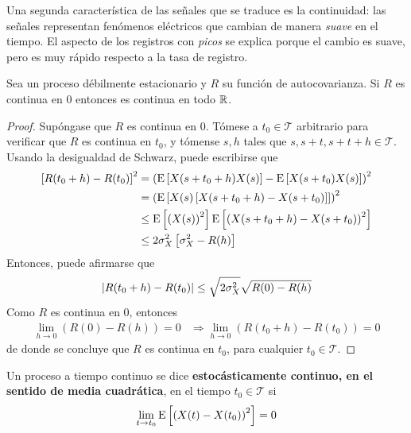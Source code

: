 Una segunda característica de las señales que se traduce es la continuidad: las señales representan fenómenos eléctricos que cambian de manera \textit{suave} en el tiempo.
%
El aspecto de los registros con \textit{picos} se explica porque el cambio es suave, pero es muy rápido respecto a la tasa de registro.

\begin{proposicion}
Sea \xt un proceso débilmente estacionario y $R$ su función de autocovarianza. Si $R$ es continua
en 0 entonces es continua en todo $\mathbb{R}$.
\end{proposicion}

\begin{proof}
Supóngase que $R$ es continua en 0. Tómese a $t_0 \in \mathcal{T}$ arbitrario para verificar que $R$ es continua en $t_0$, y tómense $s,h$ tales que $s,s+t,s+t+h \in\mathcal{T}$. Usando la desigualdad de Schwarz, puede escribirse que
\begin{align*}
\left[ R(t_0+h) -R(t_0) \right]^{2} 
&= \left( \mathrm{E}\left[ X(s+t_0+h)X(s) \right] - \mathrm{E}\left[ X(s+t_0)X(s) \right] \right)^{2}  \\
&= \left( \mathrm{E}\left[ X(s)\left[ X(s+t_0+h) - X(s+t_0) \right] \right] \right)^{2} \\
&\leq \mathrm{E}\left[ \left( X(s) \right)^{2} \right] \mathrm{E}\left[ \left( X(s+t_0+h) - X(s+t_0) \right)^{2} \right] \\
&\leq 2 \sigma_X^{2} \left[ \sigma_X^{2} - R(h) \right]
\end{align*}
Entonces, puede afirmarse que
\begin{equation*}
\left| R(t_0+h) -R(t_0) \right| \leq \sqrt{2 \sigma_X^{2}} \sqrt{R(0) - R(h)}
\end{equation*}
Como $R$ es continua en 0, entonces 
\begin{align*}
\lim_{h\rightarrow 0} (R(0)-R(h)) = 0 &\Rightarrow \lim_{h\rightarrow 0} (R(t_0+h)-R(t_0)) = 0
\end{align*}
de donde se concluye que $R$ es continua en $t_0$, para cualquier $t_0\in \mathcal{T}$.
\end{proof}    

\begin{definicion}%
Un proceso a tiempo continuo \xt se dice \textbf{estocásticamente continuo, en el sentido de media cuadrática}, en el tiempo $t_0\in \mathcal{T}$ si
\begin{equation*}
\lim_{t \rightarrow t_0} \mathrm{E}\left[ \left( X(t) - X(t_0) \right)^{2} \right] = 0
\end{equation*}
\label{cont_est}
\end{definicion}

